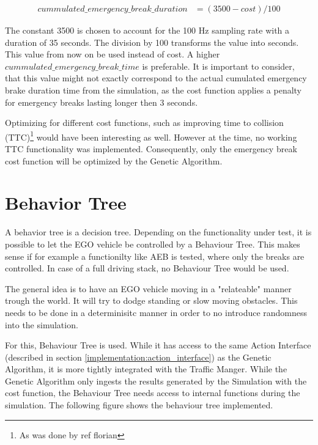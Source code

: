 \begin{equation} 
	\label{equ:modified_cost}
	\begin{split}
		cummulated\_emergency\_break\_duration & = (3500 - cost) / 100
	\end{split}
\end{equation}

The constant 3500 is chosen to account for the 100 Hz sampling rate with a duration of 35 seconds. The division by 100 transforms the value into seconds. This value from now on be used instead of cost. A higher $cummulated\_emergency\_break\_time$ is preferable. It is important to consider, that this value might not exactly correspond to the actual cumulated emergency brake duration time from the simulation, as the cost function applies a penalty for emergency breaks lasting longer then 3 seconds.

Optimizing for different cost functions, such as improving time to collision (TTC)\footnote{As was done by ref florian} would have been interesting as well. However at the time, no working TTC functionality was implemented. Consequently, only the emergency break cost function will be optimized by the Genetic Algorithm.

\section{Behavior Tree}
A behavior tree is a decision tree. 
Depending on the functionality under test, it is possible to let the EGO vehicle be controlled by a Behaviour Tree. This makes sense if for example a functionilty like AEB is tested, where only the breaks are controlled. In case of a full driving stack, no Behaviour Tree would be used.

The general idea is to have an EGO vehicle moving in a "relateable" manner trough the world. It will try to dodge standing or slow moving obstacles. This needs to be done in a determinisitc manner in order to no introduce randomness into the simulation.

For this, Behaviour Tree is used. While it has access to the same Action Interface (described in section \ref{implementation:action_interface}) as the Genetic Algorithm, it is more tightly integrated with the Traffic Manger. While the Genetic Algorithm only ingests the results generated by the Simulation with the cost function, the Behaviour Tree needs access to internal functions during the simulation. The following figure shows the behaviour tree implemented.




